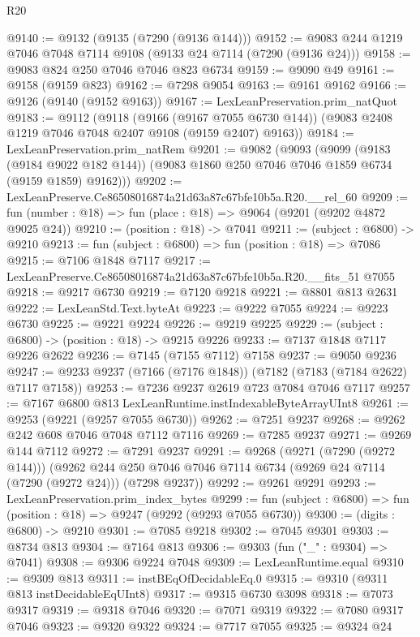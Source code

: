 \begin{lexlean}{R20}
\begin{coremodule}
{@9140 := @9132 (@9135 (@7290 (@9136 @144)))
@9152 := @9083 @244 @1219 @7046 @7048 @7114 @9108 (@9133 @24 @7114 (@7290 (@9136 @24)))
@9158 := @9083 @824 @250 @7046 @7046 @823 @6734
@9159 := @9090 @49
@9161 := @9158 (@9159 @823)
@9162 := @7298 @9054
@9163 := @9161 @9162
@9166 := @9126 (@9140 (@9152 @9163))
@9167 := LexLeanPreservation.prim_natQuot
@9183 := @9112
    (@9118
      (@9166 (@9167 @7055 @6730 @144))
      (@9083 @2408 @1219 @7046 @7048 @2407 @9108 (@9159 @2407) @9163))
@9184 := LexLeanPreservation.prim_natRem
@9201 := @9082
    (@9093
      (@9099
        (@9183 (@9184 @9022 @182 @144))
        (@9083 @1860 @250 @7046 @7046 @1859 @6734 (@9159 @1859) @9162)))
@9202 := LexLeanPreserve.Ce86508016874a21d63a87c67bfe10b5a.R20.__rel_60
@9209 := fun (number : @18) => fun (place : @18) => @9064 (@9201 (@9202 @4872 @9025 @24))
@9210 := (position : @18) -> @7041
@9211 := (subject : @6800) -> @9210
@9213 := fun (subject : @6800) => fun (position : @18) => @7086
@9215 := @7106 @1848 @7117
@9217 := LexLeanPreserve.Ce86508016874a21d63a87c67bfe10b5a.R20.__fits_51 @7055
@9218 := @9217 @6730
@9219 := @7120 @9218
@9221 := @8801 @813 @2631
@9222 := LexLeanStd.Text.byteAt
@9223 := @9222 @7055
@9224 := @9223 @6730
@9225 := @9221 @9224
@9226 := @9219 @9225
@9229 := (subject : @6800) -> (position : @18) -> @9215 @9226
@9233 := @7137 @1848 @7117 @9226 @2622
@9236 := @7145 (@7155 @7112) @7158
@9237 := @9050 @9236
@9247 := @9233 @9237 (@7166 (@7176 @1848)) (@7182 (@7183 (@7184 @2622) @7117 @7158))
@9253 := @7236 @9237 @2619 @723 @7084 @7046 @7117
@9257 := @7167 @6800 @813 LexLeanRuntime.instIndexableByteArrayUInt8
@9261 := @9253 (@9221 (@9257 @7055 @6730))
@9262 := @7251 @9237
@9268 := @9262 @242 @608 @7046 @7048 @7112 @7116
@9269 := @7285 @9237
@9271 := @9269 @144 @7112
@9272 := @7291 @9237
@9291 := @9268
    (@9271 (@7290 (@9272 @144)))
    (@9262 @244 @250 @7046 @7046 @7114 @6734 (@9269 @24 @7114 (@7290 (@9272 @24))) (@7298 @9237))
@9292 := @9261 @9291
@9293 := LexLeanPreservation.prim_index_bytes
@9299 := fun (subject : @6800) => fun (position : @18) => @9247 (@9292 (@9293 @7055 @6730))
@9300 := (digits : @6800) -> @9210
@9301 := @7085 @9218
@9302 := @7045 @9301
@9303 := @8734 @813
@9304 := @7164 @813
@9306 := @9303 (fun ("_" : @9304) => @7041)
@9308 := @9306 @9224 @7048
@9309 := LexLeanRuntime.equal
@9310 := @9309 @813
@9311 := instBEqOfDecidableEq.{0}
@9315 := @9310 (@9311 @813 instDecidableEqUInt8)
@9317 := @9315 @6730 @3098
@9318 := @7073 @9317
@9319 := @9318 @7046
@9320 := @7071 @9319
@9322 := @7080 @9317 @7046
@9323 := @9320 @9322
@9324 := @7717 @7055
@9325 := @9324 @24
}
\end{coremodule}
\end{lexlean}
